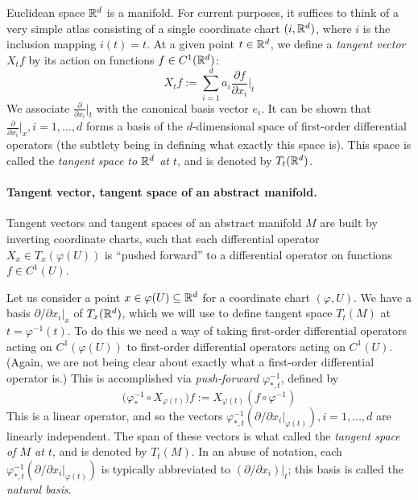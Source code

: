 \documentclass{article}
\begin{document}
	Euclidean space $\mathbb{R}^d$ is a manifold. For current purposes, it suffices to think of a very simple atlas consisting of a single coordinate chart $(i,\mathbb{R}^d)$, where $i$ is the inclusion mapping $i(t) = t$. At a given point $t \in \mathbb{R}^d$, we define a \emph{tangent vector} $X_tf$ by its action on functions $f \in C^1(\mathbb{R}^d)$:
	\begin{equation*}
		X_tf := \sum_{i = 1}^{d} a_i \frac{\partial f}{\partial x_i}\Big|_{t}
	\end{equation*}
	We associate $\frac{\partial}{\partial x_i}|_{t}$ with the canonical basis vector $e_i$. It can be shown that $\frac{\partial}{\partial x_i}|_{x}, i = 1,\ldots,d$ forms a basis of the $d$-dimensional space of first-order differential operators (the subtlety being in defining what exactly this space is). This space is called the \emph{tangent space to $\mathbb{R}^d$ at $t$}, and is denoted by $T_t(\mathbb{R}^d)$. 
	
	\paragraph{Tangent vector, tangent space of an abstract manifold.}
	Tangent vectors and tangent spaces of an abstract manifold $M$ are built by inverting coordinate charts, such that each differential operator $X_x \in T_x(\varphi(U))$ is ``pushed forward'' to a differential operator on functions $f \in C^1(U)$. 
	
	Let us consider a point $x \in \varphi(U) \subseteq \mathbb{R}^d$ for a coordinate chart $(\varphi,U)$. We have a basis $\partial/\partial x_i|_{x}$ of $T_x(\mathbb{R}^d)$, which we will use to define tangent space $T_t(M)$ at $t = \varphi^{-1}(t)$. To do this we need a way of taking first-order differential operators acting on $C^1(\varphi(U))$ to first-order differential operators acting on $C^1(U)$. (Again, we are not being clear about exactly what a first-order differential operator is.) This is accomplished via \emph{push-forward} $\varphi_{\ast,t}^{-1}$, defined by
	\begin{equation*}
		\bigg(\varphi_{\ast}^{-1} \circ X_{\varphi(t)}\bigg)f := X_{\varphi(t)}(f \circ \varphi^{-1})
	\end{equation*}
	This is a linear operator, and so the vectors $\varphi_{\ast,t}^{-1}(\partial/\partial x_i|_{\varphi(t)}), i = 1,\ldots,d$ are linearly independent. The span of these vectors is what called the \emph{tangent space of $M$ at $t$}, and is denoted by $T_t(M)$. In an abuse of notation, each $\varphi_{\ast,t}^{-1}(\partial/\partial x_i|_{\varphi(t)})$ is typically abbreviated to $(\partial/\partial x_i)|_{t}$; this basis is called the \emph{natural basis}.
	
\end{document}
